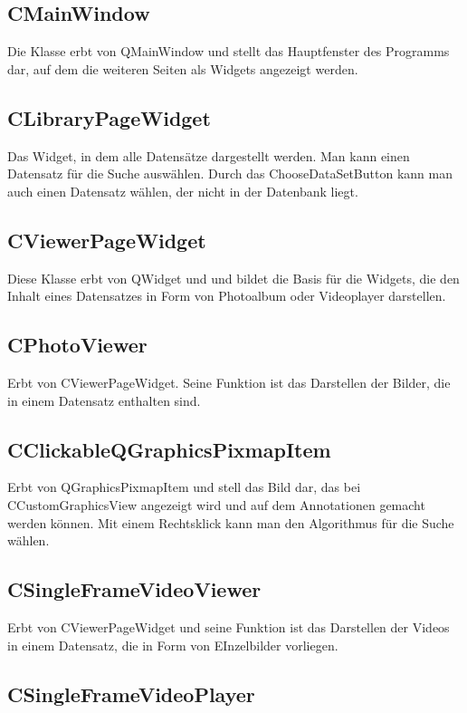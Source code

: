 \subsection*{CMainWindow}
Die Klasse erbt von QMainWindow und stellt das Hauptfenster des Programms dar, auf dem die weiteren Seiten als Widgets angezeigt werden.

\subsection*{CLibraryPageWidget}
Das Widget, in dem alle Datensätze dargestellt werden. Man kann einen Datensatz für die Suche auswählen. Durch das ChooseDataSetButton kann man auch einen Datensatz wählen, der nicht in der Datenbank liegt. 

\subsection*{CViewerPageWidget}
Diese Klasse erbt von QWidget und und bildet die Basis für die Widgets, die den Inhalt eines Datensatzes in Form von Photoalbum oder Videoplayer darstellen.

\subsection*{CPhotoViewer}
Erbt von CViewerPageWidget. Seine Funktion ist das Darstellen der Bilder, die in einem Datensatz enthalten sind.

\subsection*{CClickableQGraphicsPixmapItem}
Erbt von QGraphicsPixmapItem und stell das Bild dar, das bei CCustomGraphicsView angezeigt wird und auf dem Annotationen gemacht werden können. Mit einem Rechtsklick kann man den Algorithmus für die Suche wählen.

\subsection*{CSingleFrameVideoViewer}
Erbt von CViewerPageWidget und seine Funktion ist das Darstellen der Videos in einem Datensatz, die in Form von EInzelbilder vorliegen.

\subsection*{CSingleFrameVideoPlayer}


